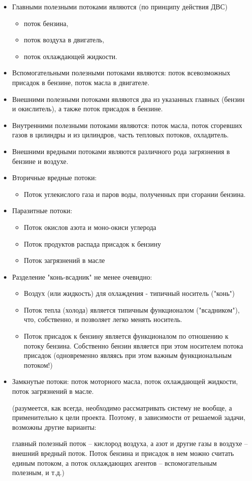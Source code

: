 \documentclass[a4paper,11pt]{article}
\begin{document}
\begin{itemize}
\item Главными полезными потоками являются (по принципу действия ДВС)
  \begin{itemize}
  \item поток бензина,
  \item поток воздуха в двигатель,
  \item поток охлаждающей жидкости.
  \end{itemize}
\item Вспомогательными полезными потоками являются: поток всевозможных
  присадок в бензине, поток масла в двигателе.
\item Внешними полезными потоками являются два из указанных главных (бензин и
  окислитель), а также поток присадок в бензине.
\item Внутренними полезными потоками являются: поток масла, поток сгоревших
  газов в цилиндры и из цилиндров, часть тепловых потоков, охладитель.
\item Внешними вредными потоками являются различного рода загрязнения в
  бензине и воздухе.
\item Вторичные вредные потоки:
  \begin{itemize}
  \item Поток углекислого газа и паров воды, полученных при сгорании бензина.
  \end{itemize}
\item Паразитные потоки:
  \begin{itemize}
  \item Поток окислов азота и моно-окиси углерода
  \item Поток продуктов распада присадок к бензину
  \item Поток загрязнений в масле
  \end{itemize}
\item Разделение "конь-всадник" не менее очевидно:
  \begin{itemize}
  \item Воздух (или жидкость) для охлаждения - типичный носитель ("конь")
  \item Поток тепла (холода) является типичным функционалом ("всадником"),
    что, собственно, и позволяет легко менять носитель.
  \item Поток присадок к бензину является функционалом по отношению к потоку
    бензина. Собственно бензин является при этом носителем потока присадок
    (одновременно являясь при этом важным функциональным потоком!)
  \end{itemize}
\item Замкнутые потоки: поток моторного масла, поток охлаждающей жидкости,
  поток загрязнений в масле.

  (разумеется, как всегда, необходимо рассматривать систему не вообще, а
  применительно к цели проекта. Поэтому, в зависимости от решаемой задачи,
  возможны другие варианты:

  главный полезный поток -- кислород воздуха, а азот и другие газы в воздухе --
  внешний вредный поток. Поток бензина и присадок в нем можно считать единым
  потоком, а поток охлаждающих агентов -- вспомогательным полезным, и т.д.)
\end{itemize}
\end{document}
